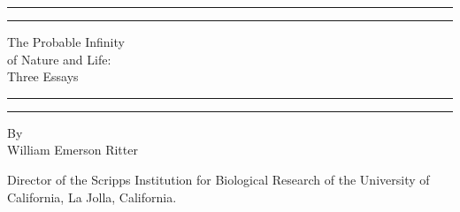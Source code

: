 \documentclass[a4paper, 11pt, oneside, polutonikogreek, english]{article}
\begin{document}
\renewcommand\thefootnote{{\bfseries\color{SkyBlue}{\arabic{footnote}}}}
\let\oldfootnote\footnote
    \renewcommand{\footnote}[1]{\oldfootnote{{\normalsize\bfseries\color{SkyBlue}#1}}}
\begin{titlepage} %
	\centering %
	\scshape %

	
	\rule{\textwidth}{1.6pt}\vspace*{-\baselineskip}\vspace*{2pt} %
	\rule{\textwidth}{0.4pt} %
	
	\vspace{0.75\baselineskip} %

        {\LARGE The Probable Infinity \\of Nature and Life: \\Three Essays \\} %
	
	\vspace{0.75\baselineskip} %
	
	\rule{\textwidth}{0.4pt}\vspace*{-\baselineskip}\vspace{3.2pt} %
	\rule{\textwidth}{1.6pt} %
	
	\vspace{1\baselineskip} %
	
	
	{By \\\Large William Emerson Ritter\\} %
	
	\vspace*{1\baselineskip} %
	

        {\small Director of the Scripps Institution for Biological Research of the University of California, La Jolla, California.}
        

\end{titlepage}
\end{document}

